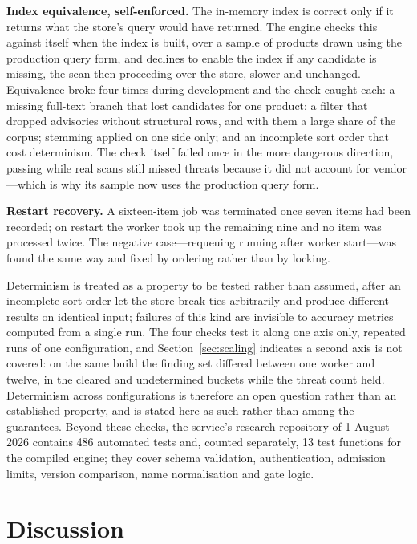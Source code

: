 \documentclass[fleqn,10pt,lineno]{wlpeerj}
\begin{document}
\textbf{Index equivalence, self-enforced.} The in-memory index is correct only if it returns what the store's query would have returned. The engine checks this against itself when the index is built, over a sample of products drawn using the production query form, and declines to enable the index if any candidate is missing, the scan then proceeding over the store, slower and unchanged. Equivalence broke four times during development and the check caught each: a missing full-text branch that lost candidates for one product; a filter that dropped advisories without structural rows, and with them a large share of the corpus; stemming applied on one side only; and an incomplete sort order that cost determinism. The check itself failed once in the more dangerous direction, passing while real scans still missed threats because it did not account for vendor---which is why its sample now uses the production query form.

\textbf{Restart recovery.} A sixteen-item job was terminated once seven items had been recorded; on restart the worker took up the remaining nine and no item was processed twice. The negative case---requeuing running after worker start---was found the same way and fixed by ordering rather than by locking.

Determinism is treated as a property to be tested rather than assumed, after an incomplete sort order let the store break ties arbitrarily and produce different results on identical input; failures of this kind are invisible to accuracy metrics computed from a single run. The four checks test it along one axis only, repeated runs of one configuration, and Section~\ref{sec:scaling} indicates a second axis is not covered: on the same build the finding set differed between one worker and twelve, in the cleared and undetermined buckets while the threat count held. Determinism across configurations is therefore an open question rather than an established property, and is stated here as such rather than among the guarantees. Beyond these checks, the service's research repository of 1 August 2026 contains 486 automated tests and, counted separately, 13 test functions for the compiled engine; they cover schema validation, authentication, admission limits, version comparison, name normalisation and gate logic.

\section{Discussion}
\label{sec:discussion}
\end{document}
